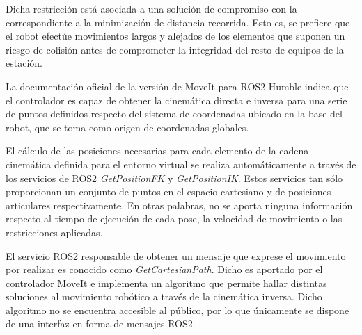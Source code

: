 Dicha restricción está asociada a una solución de compromiso con la correspondiente a la minimización de distancia recorrida. Esto es, se prefiere que el robot efectúe movimientos largos y alejados de los elementos que suponen un riesgo de colisión antes de comprometer la integridad del resto de equipos de la estación.

La documentación oficial de la versión de MoveIt para ROS2 Humble \cite{moveit_documentacion} indica que el controlador es capaz de obtener la cinemática directa e inversa para una serie de puntos definidos respecto del sistema de coordenadas ubicado en la base del robot, que se toma como origen de coordenadas globales. 

El cálculo de las posiciones necesarias para cada elemento de la cadena cinemática definida para el entorno virtual se realiza automáticamente a través de los servicios de ROS2 \textit{GetPositionFK} y \textit{GetPositionIK}. Estos servicios tan sólo proporcionan un conjunto de puntos en el espacio cartesiano y de posiciones articulares respectivamente. En otras palabras, no se aporta ninguna información respecto al tiempo de ejecución de cada pose, la velocidad de movimiento o las restricciones aplicadas.

El servicio ROS2 responsable de obtener un mensaje que exprese el movimiento por realizar es conocido como \textit{GetCartesianPath}. Dicho es aportado por el controlador MoveIt e implementa un algoritmo que permite hallar distintas soluciones al movimiento robótico a través de la cinemática inversa. Dicho algoritmo no se encuentra accesible al público, por lo que únicamente se dispone de una interfaz en forma de mensajes ROS2.

